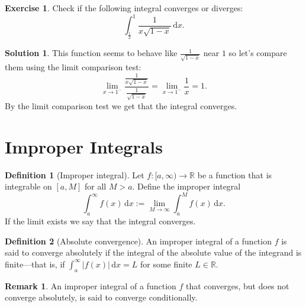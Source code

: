 \documentclass[11pt,a4paper]{article}
\theoremstyle{definition}
\newtheorem{definition}{Definition}[section]
\newtheorem*{solution}{Solution}
\newtheorem{exercise}{Exercise}[section]
\newtheorem{remark}{Remark}[section]
\theoremstyle{plain}
\newcommand\dx    {\,\mathrm{d}x}
\newcommand{\R}{\mathbb{R}}
\newcommand{\abs}[1]{\left\lvert #1\right\rvert}
\begin{document}
  \begin{exercise}
    Check if the following integral converges or diverges:
    \[
      \int_{\frac{1}{2}}^{1} \frac{1}{x \sqrt{1-x}} \dx.
    \]
  \end{exercise}
  \begin{solution}
    This function seems to behave like $\frac{1}{\sqrt{1-x}}$ near $1$
    so let's compare them using the limit comparison test:
    \[
      \lim_{x\to 1^-} \frac{\frac{1}{x\sqrt{1-x}}}{\frac{1}{\sqrt{1-x}}}
      = \lim_{x\to 1^-}{\frac{1}{x}} = 1.
    \]
    By the limit comparison test we get that the integral converges.
  \end{solution}
	
	\newpage

  \section{Improper Integrals}
  \begin{definition}[Improper integral]
    Let $f \colon [a,\infty) \to \R$ be a function that is integrable on
    $[a,M]$ for all $M > a$. Define the improper integral
    \[
      \int_{a}^{\infty} f(x) \dx :=
      \lim_{M \to \infty} \int_{a}^{M} f(x) \dx.
    \]
    If the limit exists we say that the integral converges.
  \end{definition}
  
  \begin{definition}[Absolute convergence]
    An improper integral of a function $f$ is said to converge absolutely 
    if the integral of the absolute value of the integrand is finite---that is,
    if $\int_a^\infty \abs{f(x)}\dx = L$ for some finite $L \in \R$.
  \end{definition}
  \begin{remark}
    An improper integral of a function $f$ that converges, but does not
    converge absolutely, is said to converge conditionally.
  \end{remark}
\end{document}
